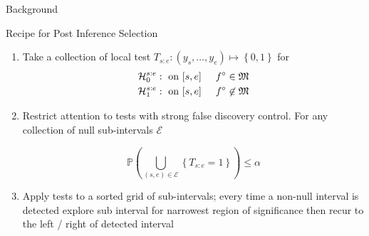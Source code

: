\documentclass{beamer}
\begin{document}
\begin{frame}{Background}



\end{frame}

\begin{frame}{Recipe for Post Inference Selection \citep{fryzlewicz2020narrowest}}

\begin{enumerate}[<+->]
\item Take a collection of local test $T_{s:e} : \left ( y_s, \dots, y_e \right ) \mapsto \left \{ 0, 1 \right \}$ for
\begin{align*}
	\label{equation: local test}
	& \mathcal{H}_0^{s:e} : \text{  on  } [s,e] \hspace{0.5 cm} f^\circ \in \mathfrak{M} \\
	& \mathcal{H}_1^{s:e} : \text{  on  } [s,e] \hspace{0.5 cm}f^\circ \not\in \mathfrak{M}
\end{align*}


\item Restrict attention to tests with strong false discovery control. For any collection of null sub-intervals $\mathcal{E}$

\begin{equation*}
	\mathbb{P} \left ( \bigcup_{(s,e) \in \mathcal{E}} \left \{ T_{s:e} = 1 \right \} \right ) \leq \alpha
\end{equation*}
\item Apply tests to a sorted grid of sub-intervals; every time a non-null interval is detected explore sub interval for narrowest region of significance then recur to the left / right of detected interval
\end{enumerate}

\end{frame}
\end{document}
